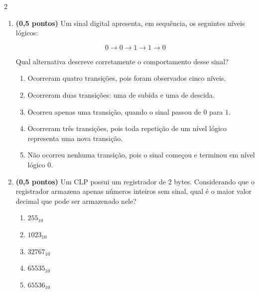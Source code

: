 \documentclass[a4paper,12pt]{article}
\begin{document}
\begin{multicols}{2}
\begin{enumerate}[leftmargin=*]
\vspace{0.2cm}


\item \textbf{(0,5 pontos)} Um sinal digital apresenta, em sequência, os seguintes níveis lógicos:

\[
0 \rightarrow 0 \rightarrow 1 \rightarrow 1 \rightarrow 0
\]

Qual alternativa descreve corretamente o comportamento desse sinal?

\begin{enumerate}[label=(\Alph*)]
    \item Ocorreram quatro transições, pois foram observados cinco níveis.
    \item Ocorreram duas transições: uma de subida e uma de descida.
    \item Ocorreu apenas uma transição, quando o sinal passou de $0$ para $1$.
    \item Ocorreram três transições, pois toda repetição de um nível lógico representa uma nova transição.
    \item Não ocorreu nenhuma transição, pois o sinal começou e terminou em nível lógico $0$.
\end{enumerate}

\vspace{0.2cm}


\item \textbf{(0,5 pontos)} Um CLP possui um registrador de 2 bytes.
Considerando que o registrador armazena apenas números inteiros sem sinal,
qual é o maior valor decimal que pode ser armazenado nele?

\begin{enumerate}[label=(\Alph*)]
    \item $255_{10}$
    \item $1023_{10}$
    \item $32767_{10}$
    \item $65535_{10}$
    \item $65536_{10}$
\end{enumerate}

\vspace{0.2cm}



\end{enumerate}
\end{multicols}
\end{document}
